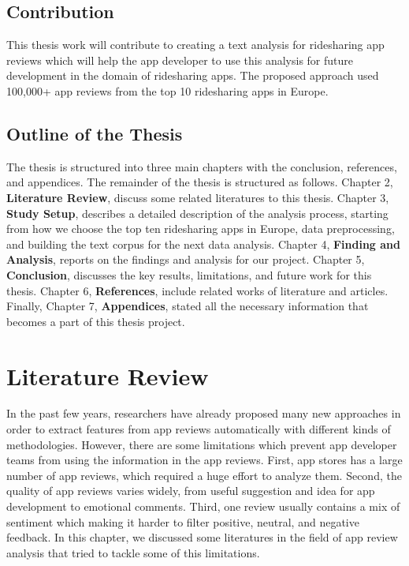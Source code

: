 \documentclass[12pt]{article}
\begin{document}
\subsection{Contribution}
This thesis work will contribute to creating a text analysis for ridesharing app reviews which will help the app developer to use this analysis for future development in the domain of ridesharing apps. The proposed approach used 100,000+ app reviews from the top 10 ridesharing apps in Europe.


\subsection{Outline of the Thesis}
The thesis is structured into three main chapters with the conclusion, references, and appendices. The remainder of the thesis is structured as follows. Chapter 2, \textbf{Literature Review}, discuss some related literatures to this thesis. Chapter 3, \textbf{Study Setup}, describes a detailed description of the analysis process, starting from how we choose the top ten ridesharing apps in Europe, data preprocessing, and building the text corpus for the next data analysis. Chapter 4, \textbf{Finding and Analysis}, reports on the findings and analysis for our project. Chapter 5, \textbf{Conclusion}, discusses the key results, limitations, and future work for this thesis. Chapter 6, \textbf{References}, include related works of literature and articles. Finally, Chapter 7, \textbf{Appendices}, stated all the necessary information that becomes a part of this thesis project.



\newpage
\section{Literature Review} 
In the past few years, researchers have already proposed many new approaches in order to extract features from app reviews automatically with different kinds of methodologies. However, there are some limitations which prevent app developer teams from using the information in the app reviews. First, app stores has a large number of app reviews, which required a huge effort to analyze them. Second, the quality of app reviews varies widely, from useful suggestion and idea for app development to emotional comments. Third, one review usually contains a mix of sentiment which making it harder to filter positive, neutral, and negative feedback. In this chapter, we discussed some literatures in the field of app review analysis that tried to tackle some of this limitations.
\end{document}
